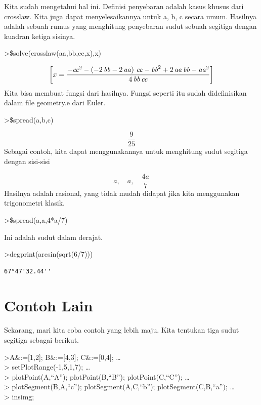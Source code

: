\documentclass[
]{book}
\begin{document}
Kita sudah mengetahui hal ini. Definisi penyebaran adalah kasus khusus dari crosslaw. Kita juga dapat menyelesaikannya untuk a, b, c secara umum. Hasilnya adalah sebuah rumus yang menghitung penyebaran sudut sebuah segitiga dengan kuadran ketiga sisinya.

\textgreater\$solve(crosslaw(aa,bb,cc,x),x)

\[\left[ x=\frac{-{\it cc}^2-\left(-2\,{\it bb}-2\,{\it aa}\right)\,  {\it cc}-{\it bb}^2+2\,{\it aa}\,{\it bb}-{\it aa}^2}{4\,{\it bb}\,  {\it cc}} \right] \]Kita bisa membuat fungsi dari hasilnya. Fungsi seperti itu sudah didefinisikan dalam file geometry.e dari Euler.

\textgreater\$spread(a,b,c)

\[\frac{9}{25}\]Sebagai contoh, kita dapat menggunakannya untuk menghitung sudut segitiga dengan sisi-sisi

\[a, \quad a, \quad \frac{4a}{7}\]Hasilnya adalah rasional, yang tidak mudah didapat jika kita menggunakan trigonometri klasik.

\textgreater\$spread(a,a,4*a/7)

Ini adalah sudut dalam derajat.

\textgreater degprint(arcsin(sqrt(6/7)))

\begin{verbatim}
67°47'32.44''
\end{verbatim}

\section{Contoh Lain}\label{contoh-lain}

Sekarang, mari kita coba contoh yang lebih maju. Kita tentukan tiga sudut segitiga sebagai berikut.

\textgreater A\&:={[}1,2{]}; B\&:={[}4,3{]}; C\&:={[}0,4{]}; \ldots{}\\
\textgreater{} setPlotRange(-1,5,1,7); \ldots{}\\
\textgreater{} plotPoint(A,``A''); plotPoint(B,``B''); plotPoint(C,``C''); \ldots{}\\
\textgreater{} plotSegment(B,A,``c''); plotSegment(A,C,``b''); plotSegment(C,B,``a''); \ldots{}\\
\textgreater{} insimg;
\end{document}

